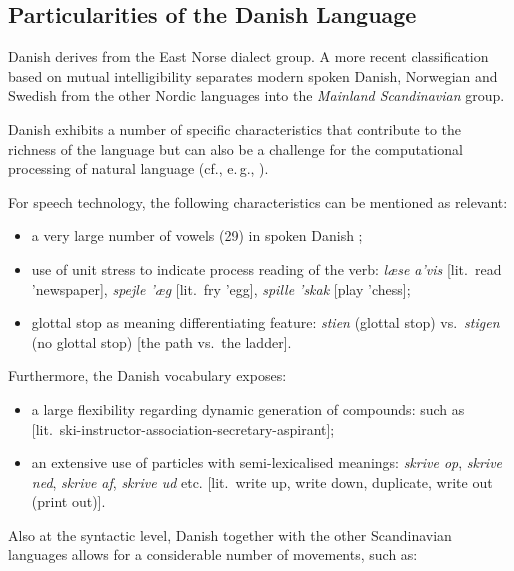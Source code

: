 \begin{multicols}{2}
\subsection{Particularities of the Danish Language}

 Danish derives from the East Norse dialect group. A more recent classification based on mutual intelligibility separates modern spoken Danish, Norwegian and Swedish from the other Nordic languages into the {\it Mainland Scandinavian} group.

Danish exhibits a number of specific characteristics that contribute to the richness of the language but can also be a challenge for the computational processing of natural language (cf., e.\,g., \cite{Gregersen, Hellan, Braasch}). 


For speech technology, the following characteristics can be mentioned as relevant:
\begin{itemize}
\item a very large number of vowels (29) in spoken Danish \cite{dansk}; 
\item	use of unit stress to indicate process reading of the verb: {\it l\ae se a'vis} [lit.\ read 'newspaper], {\it spejle '\ae g} [lit.\ fry 'egg],  {\it spille 'skak} [play 'chess];
\item	glottal stop as meaning differentiating feature: {\it stien} (glottal stop) vs.\ {\it stigen} (no glottal stop) [the path vs.\ the ladder].
\end{itemize}

Furthermore, the Danish vocabulary exposes:
\begin{itemize}
\item a large flexibility regarding dynamic generation of compounds: such as  [lit.\ ski-instructor-asso\-ciation-secretary-as\-pir\-ant]; 
\item	an extensive use of particles with semi-lexicalised meanings: {\it skrive op}, {\it skrive ned}, {\it skrive af}, {\it skrive ud} etc. [lit.\ write up, write down, duplicate, write out (print out)].
\end{itemize}
Also at the syntactic level, Danish together with the other Scandinavian languages allows for a considerable number of movements, such as:


\end{multicols}
